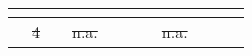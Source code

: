 \documentclass[preprint,review,12pt]{elsarticle}%
\providecommand{\DIFaddtex}[1]{{\protect\color{blue}\uwave{#1}}} %
\providecommand{\DIFdeltex}[1]{{\protect\color{red}\sout{#1}}}                      %
\providecommand{\DIFaddFL}[1]{\DIFadd{#1}} %
\providecommand{\DIFdelFL}[1]{\DIFdel{#1}} %
\providecommand{\DIFaddbeginFL}{} %
\providecommand{\DIFaddendFL}{} %
\providecommand{\DIFdelbeginFL}{} %
\providecommand{\DIFdelendFL}{} %
\providecommand{\DIFadd}[1]{\texorpdfstring{\DIFaddtex{#1}}{#1}} %
\providecommand{\DIFdel}[1]{\texorpdfstring{\DIFdeltex{#1}}{}} %
\newcommand{\DIFscaledelfig}{0.5}
\newlength{\DIFdelgraphicswidth} %
\newlength{\DIFdelgraphicsheight} %
\newcommand{\DIFaddincludegraphics}[2][]{{\color{blue}\fbox{\DIFOincludegraphics[#1]{#2}}}} %
\newcommand{\DIFdelincludegraphics}[2][]{%
\sbox{\DIFdelgraphicsbox}{\DIFOincludegraphics[#1]{#2}}%
\settoboxwidth{\DIFdelgraphicswidth}{\DIFdelgraphicsbox} %
\settoboxtotalheight{\DIFdelgraphicsheight}{\DIFdelgraphicsbox} %
\scalebox{\DIFscaledelfig}{%
\parbox[b]{\DIFdelgraphicswidth}{\usebox{\DIFdelgraphicsbox}\\[-\baselineskip] \rule{\DIFdelgraphicswidth}{0em}}\llap{\resizebox{\DIFdelgraphicswidth}{\DIFdelgraphicsheight}{%
\setlength{\unitlength}{\DIFdelgraphicswidth}%
\begin{picture}(1,1)%
\thicklines\linethickness{2pt} %
{\color[rgb]{1,0,0}\put(0,0){\framebox(1,1){}}}%
{\color[rgb]{1,0,0}\put(0,0){\line( 1,1){1}}}%
{\color[rgb]{1,0,0}\put(0,1){\line(1,-1){1}}}%
\end{picture}%
}\hspace*{3pt}}} %
} %
\DeclareRobustCommand{\DIFaddbeginFL}{\DIFOaddbeginFL \let\includegraphics\DIFaddincludegraphics} %
\DeclareRobustCommand{\DIFaddendFL}{\DIFOaddendFL \let\includegraphics\DIFOincludegraphics} %
\DeclareRobustCommand{\DIFdelbeginFL}{\DIFOdelbeginFL \let\includegraphics\DIFdelincludegraphics} %
\DeclareRobustCommand{\DIFdelendFL}{\DIFOaddendFL \let\includegraphics\DIFOincludegraphics} %
\begin{document}
\DIFdelendFL \DIFaddbeginFL \begin{table}[htbp]
\DIFaddendFL \centering
\DIFdelbeginFL %
\DIFdelendFL \DIFaddbeginFL \tiny
\setlength{\tabcolsep}{4pt}
\begin{tabular}{*{11}{r}}
\DIFaddendFL \toprule
\textbf{\DIFdelbeginFL %
\DIFdelendFL \DIFaddbeginFL \thead{$\mathrm{Subject\ ID}$}\DIFaddendFL } & \textbf{\DIFdelbeginFL %
\DIFdelendFL \DIFaddbeginFL \thead{$\mathrm{\#\ of\ sessions}$}\DIFaddendFL } & \textbf{\DIFdelbeginFL %
\DIFdelendFL \DIFaddbeginFL \thead{$\mathrm{AHL}$}\DIFaddendFL } & \textbf{\DIFdelbeginFL %
\DIFdelendFL \DIFaddbeginFL \thead{$\mathrm{AHR}$}\DIFaddendFL } & \textbf{\DIFdelbeginFL %
\DIFdelendFL \DIFaddbeginFL \thead{$\mathrm{PHL}$}\DIFaddendFL } & \textbf{\DIFdelbeginFL %
\DIFdelendFL \DIFaddbeginFL \thead{$\mathrm{PHR}$}\DIFaddendFL } & \textbf{\DIFdelbeginFL %
\DIFdelendFL \DIFaddbeginFL \thead{$\mathrm{ECL}$}\DIFaddendFL } & \textbf{\DIFdelbeginFL %
\DIFdelendFL \DIFaddbeginFL \thead{$\mathrm{ECR}$}\DIFaddendFL } & \textbf{\DIFdelbeginFL %
\DIFdelendFL \DIFaddbeginFL \thead{$\mathrm{AL}$}\DIFaddendFL } & \textbf{\DIFdelbeginFL %
\DIFdelendFL \DIFaddbeginFL \thead{$\mathrm{AR}$}\DIFaddendFL } & \textbf{\DIFdelbeginFL %
}%
\DIFdelendFL \DIFaddbeginFL \thead{$\mathrm{SOZ
}$}\DIFaddendFL } & \\
\midrule
\DIFdelbeginFL \DIFdelFL{#1 }\DIFdelendFL \DIFaddbeginFL \DIFaddFL{$\mathrm{\#1}$ }\DIFaddendFL & \DIFdelbeginFL \DIFdelFL{4 }\DIFdelendFL \DIFaddbeginFL \DIFaddFL{$\mathrm{4}$ }\DIFaddendFL & \DIFdelbeginFL %
\DIFdelendFL \DIFaddbeginFL \DIFaddFL{$\mathrm{\checkmark}$ }\DIFaddendFL & \DIFdelbeginFL \DIFdelFL{n.a. }\DIFdelendFL \DIFaddbeginFL \DIFaddFL{$\mathrm{n.a.}$ }\DIFaddendFL & \DIFdelbeginFL %
\DIFdelendFL \DIFaddbeginFL \DIFaddFL{$\mathrm{\checkmark}$ }\DIFaddendFL & \DIFdelbeginFL %
\DIFdelendFL \DIFaddbeginFL \DIFaddFL{$\mathrm{\checkmark}$ }\DIFaddendFL & \DIFdelbeginFL %
\DIFdelendFL \DIFaddbeginFL \DIFaddFL{$\mathrm{\checkmark}$ }\DIFaddendFL & \DIFdelbeginFL \DIFdelFL{n.a. }\DIFdelendFL \DIFaddbeginFL \DIFaddFL{$\mathrm{n.a.}$ }\DIFaddendFL & \DIFdelbeginFL %

\end{tabular}
\end{table}
\end{document}
